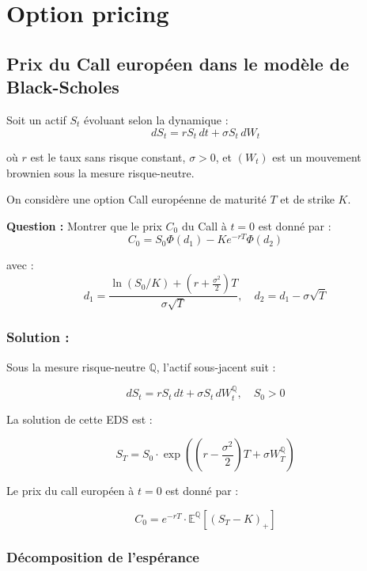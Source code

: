 \chapter{Option pricing}

\section{Prix du Call européen dans le modèle de Black-Scholes}

\begin{exerciseBox}
Soit un actif \( S_t \) évoluant selon la dynamique :
\[
dS_t = r S_t\, dt + \sigma S_t\, dW_t
\]

où \( r \) est le taux sans risque constant, \( \sigma > 0 \), et \( (W_t) \) est un mouvement brownien sous la mesure risque-neutre.

\vspace{1cm}

On considère une option Call européenne de maturité \( T \) et de strike \( K \). 

\vspace{1cm}

\textbf{Question :} Montrer que le prix \( C_0 \) du Call à \( t=0 \) est donné par :
\[
C_0 = S_0 \Phi(d_1) - K e^{-rT} \Phi(d_2)
\]

avec :
\[
d_1 = \frac{\ln(S_0/K) + (r + \frac{\sigma^2}{2})T}{\sigma \sqrt{T}}, 
\quad 
d_2 = d_1 - \sigma \sqrt{T}
\]
\end{exerciseBox}


\subsection*{Solution :}

Sous la mesure risque-neutre \( \mathbb{Q} \), l’actif sous-jacent suit :

\[
dS_t = r S_t\, dt + \sigma S_t\, dW_t^{\mathbb{Q}}, \quad S_0 > 0
\]

La solution de cette EDS est :

\[
S_T = S_0 \cdot \exp\left( \left(r - \frac{\sigma^2}{2}\right)T + \sigma W_T^{\mathbb{Q}} \right)
\]

Le prix du call européen à \( t = 0 \) est donné par :

\[
C_0 = e^{-rT} \cdot \mathbb{E}^{\mathbb{Q}}\left[ (S_T - K)_+ \right]
\]


\subsection*{Décomposition de l’espérance}

